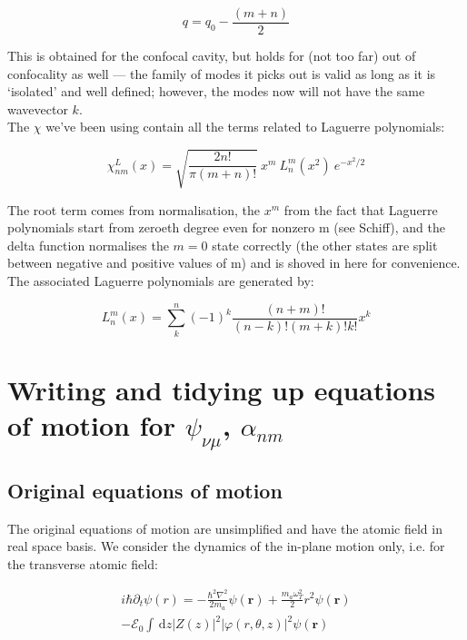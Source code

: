 \documentclass[a4paper,twocolumn,nobalancelastpage]{revtex4-1}
\newcommand{\vect}[1]{\mathbf{#1}}
\newcommand{\af}{\psi_{\nu\mu}}
\newcommand{\lf}{\alpha_{nm}}
\begin{document}
\begin{equation}
q=q_0-\frac{(m+n)}{2}
\end{equation}

This is obtained for the confocal cavity, but holds for (not too far) out of confocality as well --- the family of modes it picks out is valid as long as it is `isolated' and well defined; however, the modes now will not have the same wavevector $k$.
\\

The $\chi$ we've been using contain all the terms related to Laguerre polynomials:

\begin{equation}
\label{eq:chidef}
\chi^L_{nm}(x)=\sqrt{\frac{2n!}{\pi(m+n)!}} \ x^m  \ L^m_n(x^2) \ e^{-x^2/2}
\end{equation}

The root term comes from normalisation, the $x^m$ from the fact that Laguerre polynomials start from zeroeth degree even for nonzero m (see Schiff), and the delta function normalises the $m=0$ state correctly (the other states are split between negative and positive values of m) and is shoved in here for convenience.\\

The associated Laguerre polynomials are generated by:

\begin{displaymath}
L^m_n(x)=\sum_{k}^{n}(-1)^k \frac{(n+m)!}{(n-k)!(m+k)!k!}x^k
\end{displaymath}

\section{Writing and tidying up equations of motion for $\af$, $\lf$}

\subsection{Original equations of motion}

The original equations of motion are unsimplified and have the atomic field in real space basis. We consider the dynamics of the in-plane motion only, i.e. for the transverse atomic field:

\begin{multline}
\label{eq:eqnpsi}
i\hbar \partial_t \psi(r)= -\frac{\hbar^2 \nabla^2}{2m_a}\psi(\vect{r})+ \frac{m_a \omega_T^2}{2}r^2 \psi(\vect{r}) \\ - \mathcal{E}_0 
\int \, \mathrm{d}z |Z(z)|^2|\varphi(r, \theta,z)|^2 \psi(\vect{r})
\end{multline}
\end{document}
